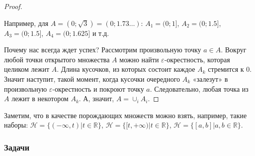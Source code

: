 \documentclass[pdftex, 12pt, a4paper]{article}
\def \mbb{\mathbb}
\def \RR{\mbb R}
\theoremstyle{definition} %
\numberwithin{problem}{section}
\numberwithin{blits}{section}
\begin{document}
\begin{proof}
\begin{center}
\end{center}

Например, для $A=(0;\sqrt{3})=(0;1.73\ldots )$:
$A_{1}=(0;1]$, $A_{2}=(0;1.5]$, $A_{3}=(0;1.5]$, $A_{4}=(0;1.625]$ и т.д.

Почему нас всегда ждет успех? Рассмотрим произвольную точку $a\in A$. Вокруг любой точки открытого множества $A$ можно найти $\varepsilon$-окрестность, которая целиком лежит $A$. Длина кусочков, из которых состоит каждое $A_{k}$ стремится к 0. Значит наступит, такой момент, когда кусочки очередного $A_{k}$ «залезут» в произвольную $\varepsilon$-окрестность и покроют точку $a$. Следовательно, любая точка из $A$ лежит в некотором $A_{k}$. А, значит, $A=\cup_{i} A_{i}$.
\end{proof}

Заметим, что в качестве порождающих множеств можно взять, например, такие наборы: $\mathcal{H} = \{(-\infty,t) | t \in \RR \}$, $\mathcal{H} = \{[t,+\infty) | t \in \RR \}$, $\mathcal{H} = \{[a,b] | a,b \in \RR \}$.


\subsubsection*{Задачи}
\end{document}

